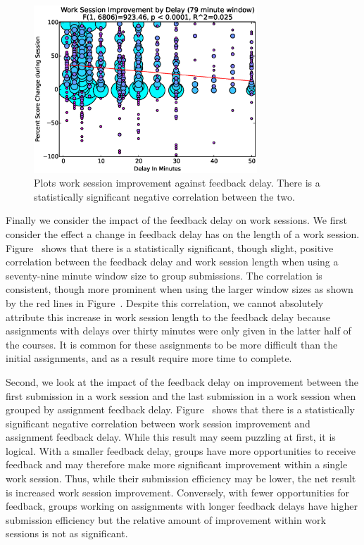 \begin{figure}[!t]
\centering
\includegraphics[width=3.3in]{graphs/Work_Session_Improvement_by_Delay_(79_minute_window).eps}
\caption{Plots work session improvement against feedback delay. There is a
  statistically significant negative correlation between the two.}
\end{figure}

Finally we consider the impact of the feedback delay on work sessions. We first
consider the effect a change in feedback delay has on the length of a work
session. Figure~ shows that there is a
statistically significant, though slight, positive correlation between the
feedback delay and work session length when using a seventy-nine minute window
size to group submissions. The correlation is consistent, though more prominent
when using the larger window sizes as shown by the red lines in
Figure~. Despite this correlation, we cannot
absolutely attribute this increase in work session length to the feedback delay
because assignments with delays over thirty minutes were only given in the
latter half of the courses. It is common for these assignments to be more
difficult than the initial assignments, and as a result require more time to
complete.

Second, we look at the impact of the feedback delay on improvement between the
first submission in a work session and the last submission in a work session
when grouped by assignment feedback
delay. Figure~ shows that there is a
statistically significant negative correlation between work session improvement
and assignment feedback delay. While this result may seem puzzling at first, it
is logical. With a smaller feedback delay, groups have more opportunities to
receive feedback and may therefore make more significant improvement within a
single work session. Thus, while their submission efficiency may be lower, the
net result is increased work session improvement. Conversely, with fewer
opportunities for feedback, groups working on assignments with longer feedback
delays have higher submission efficiency but the relative amount of improvement
within work sessions is not as significant.
